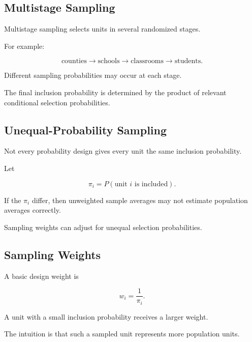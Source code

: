 \subsection{Multistage Sampling}
\label{subsec:multistage-sampling}

Multistage sampling selects units in several randomized stages.

For example:

\[
\boxed{
\text{counties}
\to
\text{schools}
\to
\text{classrooms}
\to
\text{students}.
}
\]

Different sampling probabilities may occur at each stage.

The final inclusion probability is determined by the product of relevant
conditional selection probabilities.

\subsection{Unequal-Probability Sampling}
\label{subsec:unequal-probability-sampling}

Not every probability design gives every unit the same inclusion
probability.

Let

\[
\pi_i
=
P(\text{unit }i\text{ is included}).
\]

If the \(\pi_i\) differ, then unweighted sample averages may not estimate
population averages correctly.

Sampling weights can adjust for unequal selection probabilities.

\subsection{Sampling Weights}
\label{subsec:sampling-weights}

A basic design weight is

\[
\boxed{
w_i
=
\frac1{\pi_i}.
}
\]

A unit with a small inclusion probability receives a larger weight.

The intuition is that such a sampled unit represents more population
units.

